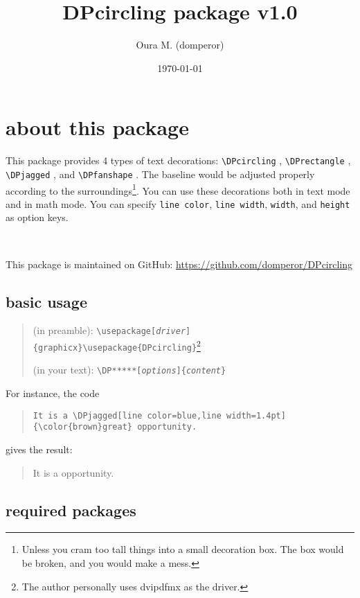 \documentclass[10pt]{article}
\title{DPcircling package v1.0}
\author{Oura M. (domperor)}
\date{\today}
\begin{document}
\maketitle\thispagestyle{empty}

\section*{about this package}

This package provides 4 types of text decorations: \verb+\DPcircling+ , \verb+\DPrectangle+ , \verb+\DPjagged+ , and \verb+\DPfanshape+ . The baseline would be adjusted properly according to the surroundings\footnote{Unless you cram too tall things into a small decoration box. The box would be broken, and you would make a mess.}. You can use these decorations both in text mode and in math mode. You can specify \verb+line color+, \verb+line width+, \verb+width+, and \verb+height+ as option keys.

\ 

This package is maintained on GitHub: \url{https://github.com/domperor/DPcircling}

\subsection*{basic usage}

\begin{quote}
(in preamble): \verb+\usepackage[+\textit{\texttt{driver}}\verb+]{graphicx}\usepackage{DPcircling}+\footnote{The author personally uses dvipdfmx as the driver.}

(in your text): \verb+\DP*****[+\textit{\texttt{options}}\verb+]{+\textit{\texttt{content}}\verb+}+
\end{quote}

For instance, the code
\begin{quote}
\begin{verbatim}
It is a \DPjagged[line color=blue,line width=1.4pt]{\color{brown}great} opportunity.
\end{verbatim}
\end{quote}
\noindent gives the result:
\begin{quote}
It is a  opportunity.
\end{quote}

\subsection*{required packages}
\end{document}
